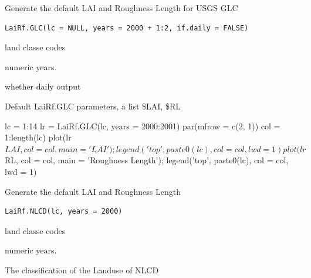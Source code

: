 \documentclass[a4paper]{book}
\begin{document}
%
\begin{Description}\relax
Generate the default LAI and Roughness Length for USGS GLC
\end{Description}
%
\begin{Usage}
\begin{verbatim}
LaiRf.GLC(lc = NULL, years = 2000 + 1:2, if.daily = FALSE)
\end{verbatim}
\end{Usage}
%
\begin{Arguments}
\begin{ldescription}
\item[\code{lc}] land classe codes

\item[\code{years}] numeric years.

\item[\code{if.daily}] whether daily output
\end{ldescription}
\end{Arguments}
%
\begin{Value}
Default LaiRf.GLC parameters, a list \$LAI, \$RL
\end{Value}
%
\begin{Examples}
\begin{ExampleCode}
lc = 1:14
lr = LaiRf.GLC(lc, years = 2000:2001)
par(mfrow = c(2, 1))
col = 1:length(lc)
plot(lr$LAI, col = col, main = 'LAI');
legend('top', paste0(lc), col = col, lwd = 1)
plot(lr$RL, col = col, main = 'Roughness Length');
legend('top', paste0(lc), col = col, lwd = 1)
\end{ExampleCode}
\end{Examples}
%
\begin{Description}\relax
Generate the default LAI and Roughness Length
\end{Description}
%
\begin{Usage}
\begin{verbatim}
LaiRf.NLCD(lc, years = 2000)
\end{verbatim}
\end{Usage}
%
\begin{Arguments}
\begin{ldescription}
\item[\code{lc}] land classe codes

\item[\code{years}] numeric years.

\item[\code{class}] The classification of the Landuse of NLCD
\end{ldescription}
\end{Arguments}
\end{document}
